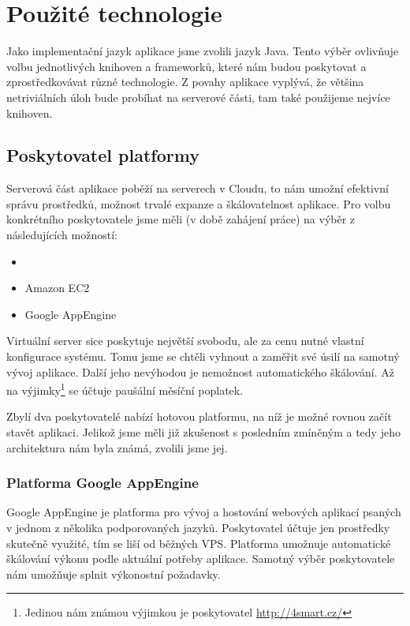 \chapter{Použité technologie}

Jako implementační jazyk aplikace jsme zvolili jazyk Java.
Tento výběr ovlivňuje volbu jednotlivých knihoven a frameworků, které nám budou poskytovat a zprostředkovávat různé technologie.
Z povahy aplikace vyplývá, že většina netriviálních úloh bude probíhat na serverové části, tam také použijeme nejvíce knihoven.

\section{Poskytovatel platformy}

Serverová část aplikace poběží na serverech v Cloudu, to nám umožní efektivní správu prostředků, možnost trvalé expanze a škálovatelnost aplikace.
Pro volbu konkrétního poskytovatele jsme měli (v době zahájení práce) na výběr z následujících možností:
\begin{itemize}
	\item {}
    \item Amazon EC2
    \item Google AppEngine
\end{itemize}

Virtuální server sice poskytuje největší svobodu, ale za cenu nutné vlastní konfigurace systému.
Tomu jsme se chtěli vyhnout a zaměřit své úsilí na samotný vývoj aplikace.
Další jeho nevýhodou je nemožnost automatického škálování.
Až na výjimky\footnote{Jedinou nám známou výjimkou je poskytovatel \url{http://4smart.cz/}} se účtuje paušální měsíční poplatek.

Zbylí dva poskytovatelé nabízí hotovou platformu, na níž je možné rovnou začít stavět aplikaci.
Jelikož jsme měli již zkušenost s posledním zmíněným a tedy jeho architektura nám byla známá, zvolili jsme jej.

\subsection{Platforma Google AppEngine}

Google AppEngine je platforma pro vývoj a hostování webových aplikací psaných v jednom z několika podporovaných jazyků.
Poskytovatel účtuje jen prostředky skutečně využité, tím se liší od běžných VPS.
Platforma umožnuje automatické škálování výkonu podle aktuální potřeby aplikace.
Samotný výběr poskytovatele nám umožňuje splnit výkonostní požadavky.

